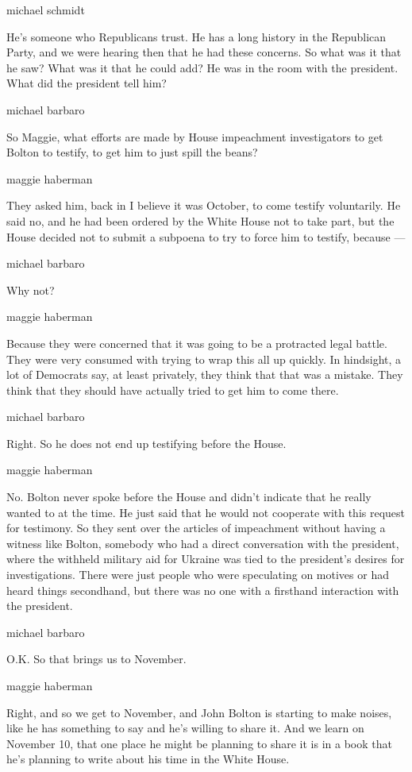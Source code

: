 michael schmidt

He's someone who Republicans trust. He has a long history in the
Republican Party, and we were hearing then that he had these concerns.
So what was it that he saw? What was it that he could add? He was in the
room with the president. What did the president tell him?

michael barbaro

So Maggie, what efforts are made by House impeachment investigators to
get Bolton to testify, to get him to just spill the beans?

maggie haberman

They asked him, back in I believe it was October, to come testify
voluntarily. He said no, and he had been ordered by the White House not
to take part, but the House decided not to submit a subpoena to try to
force him to testify, because ---

michael barbaro

Why not?

maggie haberman

Because they were concerned that it was going to be a protracted legal
battle. They were very consumed with trying to wrap this all up quickly.
In hindsight, a lot of Democrats say, at least privately, they think
that that was a mistake. They think that they should have actually tried
to get him to come there.

michael barbaro

Right. So he does not end up testifying before the House.

maggie haberman

No. Bolton never spoke before the House and didn't indicate that he
really wanted to at the time. He just said that he would not cooperate
with this request for testimony. So they sent over the articles of
impeachment without having a witness like Bolton, somebody who had a
direct conversation with the president, where the withheld military aid
for Ukraine was tied to the president's desires for investigations.
There were just people who were speculating on motives or had heard
things secondhand, but there was no one with a firsthand interaction
with the president.

michael barbaro

O.K. So that brings us to November.

maggie haberman

Right, and so we get to November, and John Bolton is starting to make
noises, like he has something to say and he's willing to share it. And
we learn on November 10, that one place he might be planning to share it
is in a book that he's planning to write about his time in the White
House.

